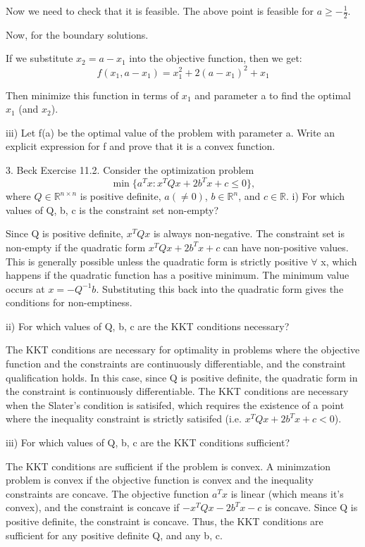 \documentclass{article}
\newcommand{\RR}{\mathbb{R}}
\begin{document}
Now we need to check that it is feasible.
The above point is feasible for $a \geq -\frac{1}{2}$.

Now, for the boundary solutions.

If we substitute $x_2 = a - x_1$ into the objective function, then we get:
\[f(x_1, a-x_1) = x_1^2 + 2 (a-x_1)^2 + x_1\]

Then minimize this function in terms of $x_1$ and parameter a to find the optimal $x_1$ (and $x_2$).

iii) Let f(a) be the optimal value of the problem with parameter a. Write an explicit expression for f and prove that it is a convex function.



3. Beck Exercise 11.2. Consider the optimization problem
\[\min \{a^T x : x^T Q x + 2 b^T x + c \leq 0\},\]
where $Q \in \RR^{n \times n}$ is positive definite, $a (\neq 0)$, $b \in \RR^n$, and $c \in \RR$.
i) For which values of Q, b, c is the constraint set non-empty?

Since Q is positive definite, $x^T Q x$ is always non-negative. The constraint
set is non-empty if the quadratic form $x^T Q x + 2b^T x + c$ can have non-positive values.
This is generally possible unless the quadratic form is strictly positive $\forall$ x,
which happens if the quadratic function has a positive minimum. The minimum
value occurs at $x = -Q^{-1} b$. Substituting this back into the quadratic form
gives the conditions for non-emptiness.

ii) For which values of Q, b, c are the KKT conditions necessary?

The KKT conditions are necessary for optimality in problems where
the objective function and the constraints are continuously differentiable,
and the constraint qualification holds. In this case, since Q is positive definite,
the quadratic form in the constraint is continuously differentiable. The KKT conditions
are necessary when the Slater's condition is satisifed, which requires the existence
of a point where the inequality constraint is strictly satisifed (i.e. $x^T Q x + 2b^T x + c < 0$).

iii) For which values of Q, b, c are the KKT conditions sufficient?

The KKT conditions are sufficient if the problem is convex. A minimzation
problem is convex if the objective function is convex and the inequality constraints
are concave. The objective function $a^T x$ is linear (which means it's convex),
and the constraint is concave if $-x^T Q x - 2b^T x - c$ is concave.
Since Q is positive definite, the constraint is concave.
Thus, the KKT conditions are sufficient for any positive definite Q, and any b, c.
\end{document}
